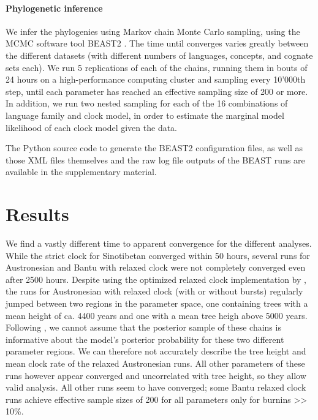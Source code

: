 \documentclass[a4paper,12pt]{scrartcl}
\begin{document}
\paragraph{Phylogenetic inference}
We infer the phylogenies using Markov chain Monte Carlo sampling, using the MCMC
software tool BEAST2 \parencite{beast2}. The time until converges varies greatly
between the different datasets (with different numbers of languages, concepts, and
cognate sets each).
We run 5 replications of each of the chains, running them in bouts of 24 hours on a high-performance
computing cluster and sampling every 10'000th step, until each parameter has reached an effective sampling size of 
200 or more.
In addition, we run two nested sampling for each of the 16 combinations of
language family and clock model, in order to estimate the marginal model likelihood
of each clock model given the data.

The Python source code to generate the BEAST2 configuration files, as well as
those XML files themselves and the raw log file outputs of the BEAST runs are
available in the supplementary material.

\section{Results}
We find a vastly different time to apparent convergence for the different
analyses. While the strict clock for Sinotibetan converged within 50 hours,
several runs for Austronesian and Bantu with relaxed clock were not completely
converged even after 2500 hours. Despite using the optimized relaxed clock
implementation by \parencite{orc}, the runs for Austronesian with relaxed clock
(with or without bursts) regularly jumped between two regions in the parameter
space, one containing trees with a mean height of ca. 4400 years and one with a
mean tree heigh above 5000 years. Following \parencite{bad-mixing}, we cannot
assume that the posterior sample of these chains is informative about the
model's posterior probability for these two different parameter regions.
We can therefore not accurately describe the tree height and mean clock rate of
the relaxed Austronesian runs. All other parameters of these runs however appear
converged and uncorrelated with tree height, so they allow valid analysis.
All other runs seem to have converged; some Bantu relaxed clock runs achieve
effective sample sizes of 200 for all parameters only for burnins >> 10\%.
\end{document}
